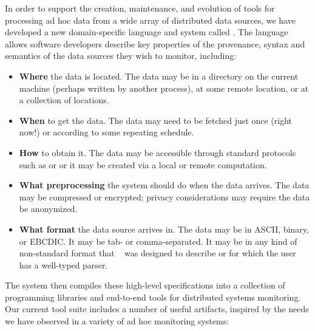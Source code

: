 In order to support the creation, maintenance, and evolution of tools
for processing ad hoc data from a wide array of distributed data
sources, we have developed a new domain-specific language and system
called \padsd{}.  The language allows software developers describe key
properties of the provenance, syntax and semantics of the data sources
they wish to monitor, including:

\begin{itemize}
\item {\bf Where} the data is located.  The data may be in a directory
on the current machine (perhaps written by another process), at some 
remote location, or at a collection of locations.
\item {\bf When} to get the data.  The data may need to be fetched just 
once (right now!) or according to some repeating schedule.
\item {\bf How} to obtain it.  The data may be accessible through standard 
protocols such as  or  or it may be created via a
local or remote computation. 
\item {\bf What preprocessing} the system should do when the data arrives.  
The data may be compressed or encrypted;  privacy considerations may require 
the data be anonymized.
\item {\bf What format} the data source arrives in.  The data may be
  in ASCII, binary, or EBCDIC. It may be tab- or comma-separated.
  It may be in any kind of non-standard format that
  \pads{}~\cite{fisher+:pads,mandelbaum+:pads-ml} was designed to 
  describe or for which the user has a well-typed parser.
\end{itemize}

The \padsd{} system then compiles these high-level specifications into
a collection of programming libraries and end-to-end tools for
distributed systems monitoring.  Our current tool suite includes a
number of useful artifacts, inspired by the needs we have observed in
a variety of ad hoc monitoring systems:

